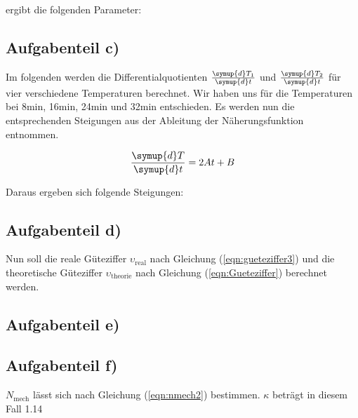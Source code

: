         ergibt die folgenden Parameter:

        


        \subsection{Aufgabenteil c)}

        Im folgenden werden die Differentialquotienten $\frac{\symup{d} T_1}{\symup{d} t}$ und $\frac{\symup{d} T_2}{\symup{d} t}$ für vier verschiedene Temperaturen berechnet.
        Wir haben uns für die Temperaturen bei 8min, 16min, 24min und 32min entschieden.
        Es werden nun die entsprechenden Steigungen aus der Ableitung der Näherungsfunktion entnommen.

        \begin{equation}
        \frac{\symup{d}T}{\symup{d}t} = 2At + B
        \end{equation}

        Daraus ergeben sich folgende Steigungen:
        
        


        \newpage
        \subsection{Aufgabenteil d)}

        Nun soll die reale Güteziffer $\upsilon_\text{real}$ nach Gleichung (\ref{eqn:gueteziffer3}) und die theoretische Güteziffer $\upsilon_\text{theorie}$ nach Gleichung (\ref{eqn:Gueteziffer}) berechnet werden.

        



        \subsection{Aufgabenteil e)}


        \subsection{Aufgabenteil f)}

        $N_\text{mech}$ lässt sich nach Gleichung (\ref{eqn:nmech2}) bestimmen.
        $\kappa$ beträgt in diesem Fall 1.14

        

        